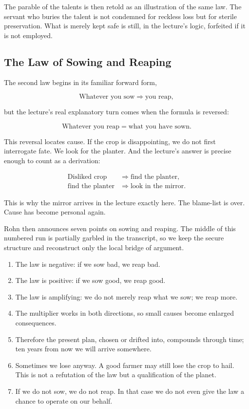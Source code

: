 The parable of the talents is then retold as an illustration of the same law. The servant who buries the talent is not condemned for reckless loss but for sterile preservation. What is merely kept safe is still, in the lecture's logic, forfeited if it is not employed.

\subsection{The Law of Sowing and Reaping}

The second law begins in its familiar forward form,

\begin{equation}
\text{Whatever you sow} \Longrightarrow \text{you reap},
\end{equation}

but the lecture's real explanatory turn comes when the formula is reversed:

\begin{equation}
\text{Whatever you reap}=\text{what you have sown}.
\end{equation}

This reversal locates cause. If the crop is disappointing, we do not first interrogate fate. We look for the planter. And the lecture's answer is precise enough to count as a derivation:

\begin{align}
\text{Disliked crop} &\Longrightarrow \text{find the planter},\\
\text{find the planter} &\Longrightarrow \text{look in the mirror}.
\end{align}

This is why the mirror arrives in the lecture exactly here. The blame-list is over. Cause has become personal again.

Rohn then announces seven points on sowing and reaping. The middle of this numbered run is partially garbled in the transcript, so we keep the secure structure and reconstruct only the local bridge of argument.

\begin{enumerate}
\item The law is negative: if we sow bad, we reap bad.
\item The law is positive: if we sow good, we reap good.
\item The law is amplifying: we do not merely reap what we sow; we reap more.
\item The multiplier works in both directions, so small causes become enlarged consequences.
\item Therefore the present plan, chosen or drifted into, compounds through time; ten years from now we will arrive somewhere.
\item Sometimes we lose anyway. A good farmer may still lose the crop to hail. This is not a refutation of the law but a qualification of the planet.
\item If we do not sow, we do not reap. In that case we do not even give the law a chance to operate on our behalf.
\end{enumerate}

